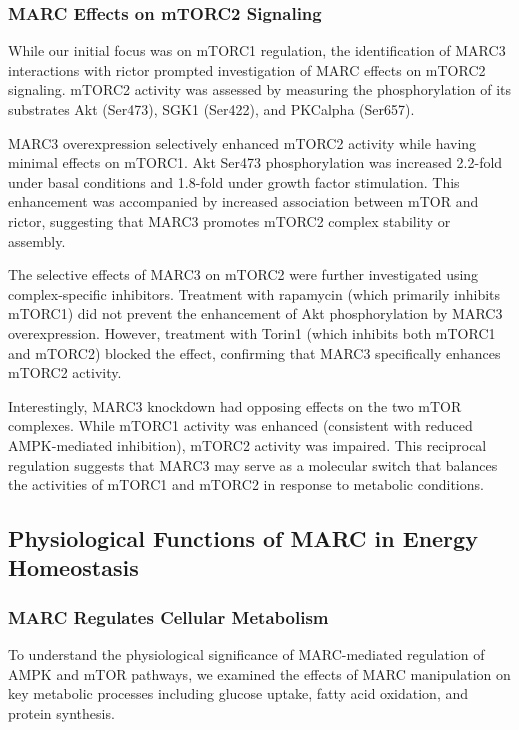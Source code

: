 \documentclass[11pt,a4paper]{article}
\begin{document}
\subsubsection{MARC Effects on mTORC2 Signaling}

While our initial focus was on mTORC1 regulation, the identification of MARC3 interactions with rictor prompted investigation of MARC effects on mTORC2 signaling. mTORC2 activity was assessed by measuring the phosphorylation of its substrates Akt (Ser473), SGK1 (Ser422), and PKCalpha (Ser657).

MARC3 overexpression selectively enhanced mTORC2 activity while having minimal effects on mTORC1. Akt Ser473 phosphorylation was increased 2.2-fold under basal conditions and 1.8-fold under growth factor stimulation. This enhancement was accompanied by increased association between mTOR and rictor, suggesting that MARC3 promotes mTORC2 complex stability or assembly.

The selective effects of MARC3 on mTORC2 were further investigated using complex-specific inhibitors. Treatment with rapamycin (which primarily inhibits mTORC1) did not prevent the enhancement of Akt phosphorylation by MARC3 overexpression. However, treatment with Torin1 (which inhibits both mTORC1 and mTORC2) blocked the effect, confirming that MARC3 specifically enhances mTORC2 activity.

Interestingly, MARC3 knockdown had opposing effects on the two mTOR complexes. While mTORC1 activity was enhanced (consistent with reduced AMPK-mediated inhibition), mTORC2 activity was impaired. This reciprocal regulation suggests that MARC3 may serve as a molecular switch that balances the activities of mTORC1 and mTORC2 in response to metabolic conditions.

\subsection{Physiological Functions of MARC in Energy Homeostasis}

\subsubsection{MARC Regulates Cellular Metabolism}

To understand the physiological significance of MARC-mediated regulation of AMPK and mTOR pathways, we examined the effects of MARC manipulation on key metabolic processes including glucose uptake, fatty acid oxidation, and protein synthesis.
\end{document}
